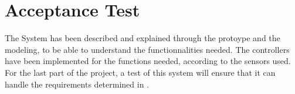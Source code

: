 \chapter{Acceptance Test}\label{cha:AcceptTest}

The System has been described and explained through the protoype and the modeling, to be able to understand the functionnalities needed. The controllers have been implemented for the functions needed, according to the sensors used. For the last part of the project, a test of this system will ensure that it can handle the requirements determined in .